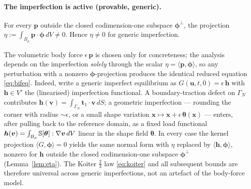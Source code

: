 \paragraph{The imperfection is active (provable, generic).}
\begin{lemma}
    \label{lem:eta}
    For every $\bm{p}$ outside the closed codimension-one subspace $\bm{\phi}^\perp$, the projection
    $\eta:=\int_{B_\rho}\bm{p}\cdot\bm{\phi}\,dV\neq0$. Hence $\eta\neq0$ for generic imperfection.
\end{lemma}

\begin{remark}
    \label{rem:imperfuniv}
    The volumetric body force $\epsilon\,\bm{p}$ is chosen only for concreteness; the analysis depends on the
    imperfection \emph{solely} through the scalar $\eta=\langle\bm{p},\bm{\phi}\rangle$, so any perturbation with a
    nonzero $\bm{\phi}$-projection produces the identical reduced equation \eqref{eq:bifeq}. Indeed, write a generic
    imperfect equilibrium as $G(\bm{u},t,0)=\epsilon\,\bm{h}$ with $\bm{h}\in V'$ the (linearised) imperfection
    functional. A boundary-traction defect on $\Gamma_N$ contributes $\bm{h}(\bm{v})=\int_{\Gamma_N}\bm{t}_1\cdot\bm{v}\,dS$;
    a geometric imperfection --- rounding the corner with radius $\sim\epsilon$, or a small shape variation
    $\bm{x}\mapsto\bm{x}+\epsilon\,\bm{\theta}(\bm{x})$ --- enters, after pulling back to the reference domain, as a
    fixed load functional $\bm{h}(\bm{v})=\int_{B_\rho}\mathbb{S}[\bm{\theta}]:\nabla\bm{v}\,dV$ linear in the shape field
    $\bm{\theta}$. In every case the kernel projection $\langle G,\bm{\phi}\rangle=0$ yields the same normal form with
    $\eta$ replaced by $\langle\bm{h},\bm{\phi}\rangle$, nonzero for $\bm{h}$ outside the closed codimension-one subspace
    $\bm{\phi}^\perp$ (Lemma~\ref{lem:eta}). The Koiter $\tfrac23$ law \eqref{eq:koiter} and all subsequent bounds are
    therefore universal across generic imperfections, not an artefact of the body-force model.
\end{remark}

